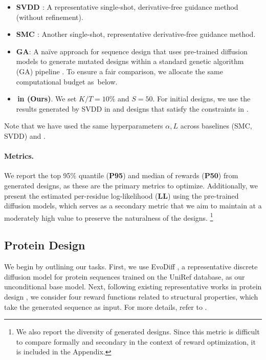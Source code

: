 \begin{itemize}
    \item \textbf{SVDD \citep{li2024derivative}}:  A representative single-shot, derivative-free guidance method (without refinement).
    \item \textbf{SMC \citep{wu2024practical}}: Another single-shot, representative derivative-free guidance method.
    \item \textbf{GA}: A na\"ive approach for sequence design that uses pre-trained diffusion models to generate mutated designs within a standard genetic algorithm (GA) pipeline \citep{hie2022high}. To ensure a fair comparison, we allocate the same computational budget as \alg\,below. 
    \item \textbf{\alg\,in  (Ours)}. We set $K/T=10\%$ and $S=50$.  For initial designs, we use the results generated by SVDD in  and designs that satisfy the constraints in .
\end{itemize}
Note that we have used the same hyperparameters $\alpha,L$ across baselines (SMC, SVDD) and \alg. 

\vspace{-3mm}
\paragraph{Metrics.}  We report the top 95\% quantile (\textbf{P95}) and median of rewards (\textbf{P50}) from generated designs, as these are the primary metrics to optimize. Additionally, we present the estimated per-residue log-likelihood (\textbf{LL}) using the pre-trained diffusion models, which serves as a secondary metric that we aim to maintain at a moderately high value to preserve the naturalness of the designs. \footnote{We also report the diversity of generated designs. Since this metric is difficult to compare formally and secondary in the context of reward optimization, it is included in the Appendix.}



\subsection{Protein Design}\label{sec:protein}

We begin by outlining our tasks. First, we use EvoDiff \citep{alamdari2023protein}, a representative discrete diffusion model for protein sequences trained on the UniRef database, as our unconditional base model. Next, following existing representative works in protein design \citep{hie2022high,watson2023novo,ingraham2023illuminating}, we consider four reward functions related to structural properties, which take the generated sequence as input. For more details, refer to . 

